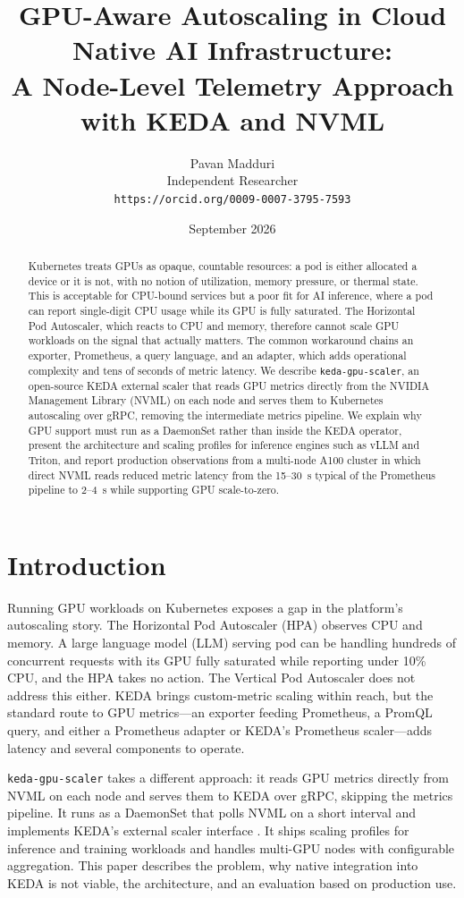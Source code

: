 \documentclass[11pt]{article}
\title{GPU-Aware Autoscaling in Cloud Native AI Infrastructure:\\
A Node-Level Telemetry Approach with KEDA and NVML}
\author{Pavan Madduri\\
Independent Researcher\\
\texttt{https://orcid.org/0009-0007-3795-7593}}
\date{September 2026}
\begin{document}
\maketitle

\begin{abstract}
Kubernetes treats GPUs as opaque, countable resources: a pod is either allocated
a device or it is not, with no notion of utilization, memory pressure, or thermal
state. This is acceptable for CPU-bound services but a poor fit for AI inference,
where a pod can report single-digit CPU usage while its GPU is fully saturated.
The Horizontal Pod Autoscaler, which reacts to CPU and memory, therefore cannot
scale GPU workloads on the signal that actually matters. The common workaround
chains an exporter, Prometheus, a query language, and an adapter, which adds
operational complexity and tens of seconds of metric latency. We describe
\texttt{keda-gpu-scaler}, an open-source KEDA external scaler that reads GPU
metrics directly from the NVIDIA Management Library (NVML) on each node and
serves them to Kubernetes autoscaling over gRPC, removing the intermediate
metrics pipeline. We explain why GPU support must run as a DaemonSet rather than
inside the KEDA operator, present the architecture and scaling profiles for
inference engines such as vLLM and Triton, and report production observations
from a multi-node A100 cluster in which direct NVML reads reduced metric latency
from the 15--30~s typical of the Prometheus pipeline to 2--4~s while supporting
GPU scale-to-zero.
\end{abstract}

\section{Introduction}

Running GPU workloads on Kubernetes exposes a gap in the platform's autoscaling
story. The Horizontal Pod Autoscaler (HPA) observes CPU and memory. A large
language model (LLM) serving pod can be handling hundreds of concurrent requests
with its GPU fully saturated while reporting under 10\% CPU, and the HPA takes no
action. The Vertical Pod Autoscaler does not address this either. KEDA
\cite{keda} brings custom-metric scaling within reach, but the standard route to
GPU metrics---an exporter feeding Prometheus, a PromQL query, and either a
Prometheus adapter or KEDA's Prometheus scaler---adds latency and several
components to operate.

\texttt{keda-gpu-scaler} \cite{kgs} takes a different approach: it reads GPU
metrics directly from NVML \cite{nvml} on each node and serves them to KEDA over
gRPC, skipping the metrics pipeline. It runs as a DaemonSet that polls NVML on a
short interval and implements KEDA's external scaler interface
\cite{keda-extscaler}. It ships scaling profiles for inference and training
workloads and handles multi-GPU nodes with configurable aggregation. This paper
describes the problem, why native integration into KEDA is not viable, the
architecture, and an evaluation based on production use.
\end{document}
